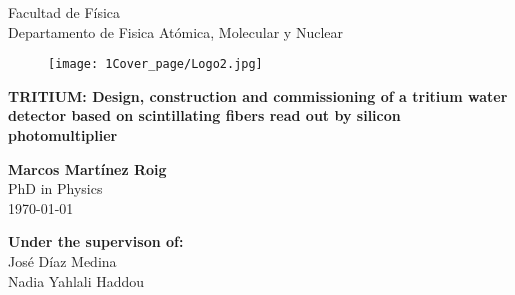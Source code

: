 \begin{titlepage}

\begin{center}


{\large Facultad de Física}\\
{\large Departamento de Fisica Atómica, Molecular y Nuclear}\\
\vspace*{0.2in}
\vspace*{0.6in}
\end{center}
\vspace*{-1in}
\begin{center}
\vspace*{1 cm}


\begin{figure}[htb]
\begin{center}
\texttt{[image: 1Cover\_page/Logo2.jpg]} 
\end{center}
\end{figure}
\vspace*{1 cm}

\begin{large}

\end{large}
\begin{Large}
\textbf{\LARGE TRITIUM: Design, construction and commissioning of a tritium water detector based on scintillating fibers read out by silicon photomultiplier} \\
\end{Large}
\vspace*{1.2 cm}

\begin{large}
\textbf{Marcos Martínez Roig}\\
PhD in Physics\\
\today
\end{large}
\end{center}

\vspace*{-1.2 cm}
\begin{large}
\begin{flushright}
\item[\bf Under the supervison of:]\quad  \\ 
José Díaz Medina\\
Nadia Yahlali Haddou\\
\end{flushright}
\end{large}

\end{titlepage}
